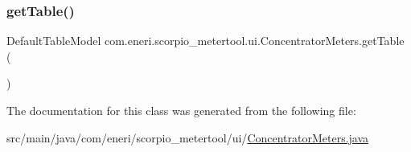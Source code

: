 \subsubsection{\texorpdfstring{get\+Table()}{getTable()}}
{\footnotesize\ttfamily Default\+Table\+Model com.\+eneri.\+scorpio\+\_\+metertool.\+ui.\+Concentrator\+Meters.\+get\+Table (\begin{DoxyParamCaption}{ }\end{DoxyParamCaption})}



The documentation for this class was generated from the following file\+:\begin{DoxyCompactItemize}
\item 
src/main/java/com/eneri/scorpio\+\_\+metertool/ui/\hyperlink{_concentrator_meters_8java}{Concentrator\+Meters.\+java}\end{DoxyCompactItemize}

